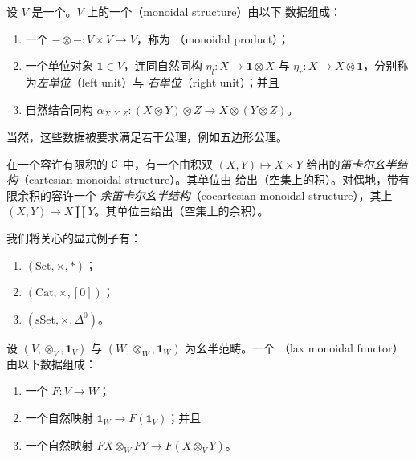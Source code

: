 \begin{definition}\label{def:monoidal-structure}
设 $V$ 是一个\trCategory{}。$V$ 上的一个\emph{\trMonoidalStructure{}}（monoidal structure）由以下
数据组成：
\begin{enumerate}[label=(\arabic*)]
  \item 一个\trFunctor{} $- \otimes -\colon V \times V \to V$，称为\emph{\trMonoidalProduct{}}
  （monoidal product）；
  \item 一个单位对象 $\mathbf{1} \in V$，连同自然同构
  $\eta_l\colon X \to \mathbf{1} \otimes X$ 与
  $\eta_r\colon X \to X \otimes \mathbf{1}$，分别称为\emph{左单位}（left unit）与
  \emph{右单位}（right unit）；并且
  \item 自然结合同构 $\alpha_{X,Y,Z}\colon (X \otimes Y) \otimes Z \to X \otimes (Y \otimes Z)$。
\end{enumerate}
当然，这些数据被要求满足若干公理，例如五边形公理。
\end{definition}

\begin{example*}
在一个容许有限积的\trCategory{} $\mathcal{C}$ 中，有一个由积双\trFunctor{} $(X, Y) \mapsto X \times Y$
给出的\emph{笛卡尔幺半结构}（cartesian monoidal structure）。其单位由%
\trTerminalObject{}给出（空集上的积）。对偶地，带有限余积的\trCategory{}容许一个%
\emph{余笛卡尔幺半结构}（cocartesian monoidal structure），其上
$(X, Y) \mapsto X \amalg Y$。其单位由\trInitialObject{}给出（空集上的余积）。
\end{example*}

我们将关心的显式例子有：
\begin{enumerate}[label=(\arabic*)]
  \item \trCategory{} $(\mathrm{Set}, \times, *)$；
  \item \trCategory{} $(\mathrm{Cat}, \times, [0])$；
  \item \trCategory{} $(\mathrm{sSet}, \times, \Delta^0)$。
\end{enumerate}

\begin{definition}\label{def:lax-monoidal-functor}
设 $(V, \otimes_V, \mathbf{1}_V)$ 与 $(W, \otimes_W, \mathbf{1}_W)$ 为幺半范畴。一个%
\emph{\trLaxMonoidalFunctor{}}（lax monoidal functor）由以下数据组成：
\begin{enumerate}[label=(\arabic*)]
  \item 一个\trFunctor{} $F\colon V \to W$；
  \item 一个自然映射 $\mathbf{1}_W \to F(\mathbf{1}_V)$；并且
  \item 一个自然映射 $FX \otimes_W FY \to F(X \otimes_V Y)$。
\end{enumerate}
\end{definition}

